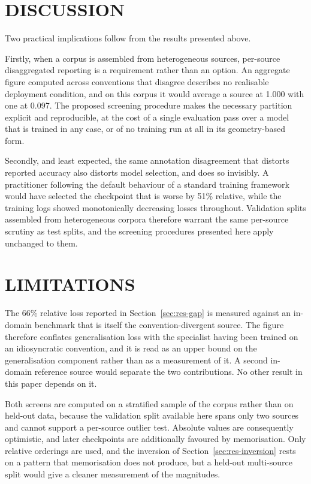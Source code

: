 \section{\uppercase{Discussion}}

\noindent Two practical implications follow from the results presented above.

Firstly, when a corpus is assembled from heterogeneous sources, per-source
disaggregated reporting is a requirement rather than an option. An aggregate figure
computed across conventions that disagree describes no realisable deployment
condition, and on this corpus it would average a source at 1.000 with one at 0.097.
The proposed screening procedure makes the necessary partition explicit and
reproducible, at the cost of a single evaluation pass over a model that is trained in
any case, or of no training run at all in its geometry-based form.

Secondly, and least expected, the same annotation disagreement that distorts reported
accuracy also distorts model selection, and does so invisibly. A practitioner
following the default behaviour of a standard training framework would have selected
the checkpoint that is worse by 51\% relative, while the training logs showed
monotonically decreasing losses throughout. Validation splits assembled from
heterogeneous corpora therefore warrant the same per-source scrutiny as test splits,
and the screening procedures presented here apply unchanged to them.

\section{\uppercase{Limitations}}
\label{sec:limits}

\noindent The 66\% relative loss reported in Section~\ref{sec:res-gap} is measured
against an in-domain benchmark that is itself the convention-divergent source. The
figure therefore conflates generalisation loss with the specialist having been trained
on an idiosyncratic convention, and it is read as an upper bound on the generalisation
component rather than as a measurement of it. A second in-domain reference source
would separate the two contributions. No other result in this paper depends on it.

Both screens are computed on a stratified sample of the corpus rather than on held-out
data, because the validation split available here spans only two sources and cannot
support a per-source outlier test. Absolute values are consequently optimistic, and
later checkpoints are additionally favoured by memorisation. Only relative orderings
are used, and the inversion of Section~\ref{sec:res-inversion} rests on a pattern that
memorisation does not produce, but a held-out multi-source split would give a cleaner
measurement of the magnitudes.

